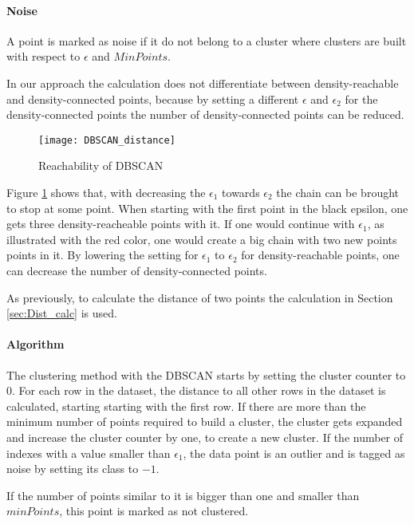 \paragraph{Noise}
A point is marked as noise if it do not belong to a cluster where clusters are built with respect to $\epsilon$ and $MinPoints$.
\newline

In our approach the calculation does not differentiate between density-reachable and density-connected points, because by setting a different $\epsilon$ and $\epsilon_{2}$ for the density-connected points the number of density-connected points can be reduced.

\begin{figure}
    \centering
    \texttt{[image: DBSCAN\_distance]}
    \caption{Reachability of DBSCAN}
    \label{fig:DBSCAN_distance}
\end{figure}

Figure \ref{fig:DBSCAN_distance} shows that, with decreasing the $\epsilon_{1}$ towards $\epsilon_{2}$ the chain can be brought to stop at some point. 
When starting with the first point in the black epsilon, one gets three density-reacheable points with it.
If one would continue with $\epsilon_{1}$, as illustrated with the red color, one would create a big chain with two new points points in it.
By lowering the setting for $\epsilon_{1}$ to $\epsilon_{2}$ for density-reachable points, one can decrease the number of density-connected points.

As previously, to calculate the distance of two points the calculation in Section \ref{sec:Dist_calc} is used.

\paragraph{Algorithm}

The clustering method with the DBSCAN starts by setting the cluster counter to 0.
For each row in the dataset, the distance to all other rows in the dataset is calculated, starting starting with the first row.
If there are more than the minimum number of points required to build a cluster, the cluster gets expanded and increase the cluster counter by one, to create a new cluster.
If the number of indexes with a value smaller than $\epsilon_{1}$, the data point is an outlier and is tagged as noise by setting its class to $-1$.

If the number of points similar to it is bigger than one and smaller than $minPoints$, this point is marked as not clustered.


